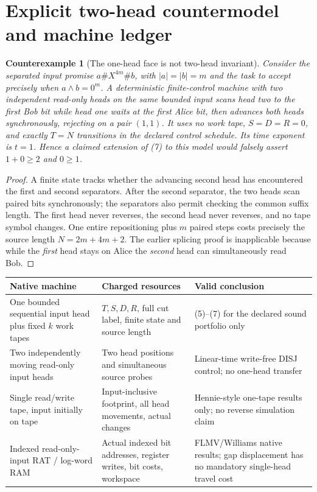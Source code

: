 \documentclass[11pt]{article}
\newtheorem{counterexample}[theorem]{Counterexample}
\begin{document}
\section{Explicit two-head countermodel and machine ledger}
\begin{counterexample}[The one-head face is not two-head invariant]
\label{th:twohead}
Consider the separated input promise $a\#X^{4m}\#b$,
with $|a|=|b|=m$ and the task to accept precisely when
$a\wedge b=0^m$. A deterministic finite-control machine
with \emph{two independent} read-only heads on the
\emph{same bounded} input scans head two to the first
Bob bit while head one waits at the first Alice bit,
then advances both heads synchronously, rejecting on
a pair $(1,1)$. It uses \emph{no work tape},
$S=D=R=0$, and exactly $T=N$ transitions in the declared
control schedule. Its time exponent is $t=1$.
Hence a claimed extension of (7) to this model
would falsely assert $1+0\ge2$ and $0\ge1$.
\end{counterexample}
\begin{proof}
A finite state tracks whether the advancing second
head has encountered the first and second separators.
After the second separator, the two heads scan
paired bits synchronously; the separators also permit
checking the common suffix length. The first head never
reverses, the second head never reverses, and no tape
symbol changes. One entire repositioning plus $m$
paired steps costs precisely the source length
$N=2m+4m+2$. The earlier splicing proof is inapplicable
because while the \emph{first} head stays on Alice the
\emph{second} head can simultaneously read Bob.
\end{proof}

\begin{center}
\begin{tabular}{p{.26\linewidth}p{.31\linewidth}p{.34\linewidth}}
\toprule
Native machine & Charged resources & Valid conclusion\\\midrule
One bounded sequential input head plus fixed $k$ work tapes &
$T,S,D,R$, full cut label, finite state and source length &
(5)--(7) for the declared sound portfolio only\\
Two independently moving read-only input heads &
Two head positions and simultaneous source probes &
Linear-time write-free DISJ control; no one-head transfer\\
Single read/write tape, input initially on tape &
Input-inclusive footprint, all head movements, actual changes &
Hennie-style one-tape results only; no reverse simulation claim\\
Indexed read-only-input RAT / log-word RAM &
Actual indexed bit addresses, register writes, bit costs, workspace &
FLMV/Williams native results; gap displacement has no mandatory
single-head travel cost\\
\bottomrule
\end{tabular}
\end{center}
\end{document}
